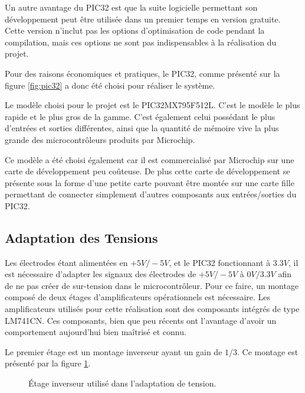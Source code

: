 \documentclass[letterpaper, twoside, 12pt, memoire, creativecommons, hyperref]{thETS}
\begin{document}
Un autre avantage du PIC32 est que la suite logicielle permettant son développement peut être utilisée dans un premier temps en version gratuite. Cette version n'inclut pas les options d'optimisation de code pendant la compilation, mais ces options ne sont pas indispensables à la réalisation du projet. 

Pour des raisons économiques et pratiques, le PIC32, comme présenté sur la figure \ref{fig:pic32} a donc été choisi pour réaliser le système.
 
Le modèle choisi pour le projet est le PIC32MX795F512L. C'est le modèle le plus rapide et le plus gros de la gamme. C'est également celui possédant le plus d'entrées et sorties différentes, ainsi que la quantité de mémoire vive la plus grande des microcontrôleurs produits par Microchip.

Ce modèle a été choisi également car il est commercialisé par Microchip sur une carte de développement peu coûteuse. De plus cette carte de développement se présente sous la forme d'une petite carte pouvant être montée sur une carte fille permettant de connecter simplement d'autres composants aux entrées/sorties du PIC32. 


\subsection{Adaptation des Tensions}

Les électrodes étant alimentées en $+5V/-5V$, et le PIC32 fonctionnant à $3.3V$, il est nécessaire d’adapter les signaux des électrodes de $+5V/-5V$ à $0V/3.3V$ afin de ne pas créer de sur-tension dans le microcontrôleur. Pour ce faire, un montage composé de deux étages d'amplificateurs opérationnels est nécessaire.  Les amplificateurs utilisés pour cette réalisation sont des composants intégrés de type LM741CN. Ces composants, bien que peu récents ont l'avantage d'avoir un comportement aujourd'hui bien maîtrisé et connu. 

Le premier étage est un montage inverseur ayant un gain de $1/3$. Ce montage est présenté par la figure \ref{fig:inverseur}.

\begin{figure}
	\centering
	\caption{Étage inverseur utilisé dans l'adaptation de tension.}
	\label{fig:inverseur}
\end{figure}
\end{document}
